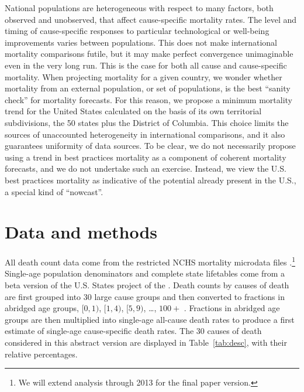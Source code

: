 \documentclass[11pt,oneside,a4paper]{article} %
\begin{document}
National populations are heterogeneous with respect to many factors, both
observed and unobserved, that affect cause-specific mortality rates. The level and timing of cause-specific responses to particular
technological or well-being improvements varies between populations. This does
not make international mortality comparisons futile, but it may make perfect
convergence unimaginable even in the very long run. This is the case for both
all cause and cause-specific mortality. When projecting mortality for a given country, we wonder whether mortality from an external population, or set of populations, is the best ``sanity
check'' for mortality forecasts.
For this reason, we propose a minimum mortality trend for the United States
calculated on the basis of its own territorial subdivisions, the 50 states plus
the District of Columbia. This choice limits the sources of unaccounted
heterogeneity in international comparisons, and it also guarantees uniformity of
data sources.
To be clear, we do not necessarily propose using a trend in best practices mortality as a component of coherent mortality forecasts, and we do
not undertake such an exercise. Instead, we view the U.S. best practices
mortality as indicative of the potential already present in the U.S., a special
kind of ``nowcast''.

\section*{Data and methods}
All death count data come from the restricted NCHS mortality microdata files
\citep{NCHSdata}.\footnote{We will extend analysis
through 2013 for the final paper version.} Single-age population denominators
and complete state lifetables come from a beta version of the U.S.
States project of the \citet{HMD}. Death counts by causes of death are first
grouped into 30 large cause groups and then converted to fractions in abridged
age groups, $[0,1)$, $[1,4)$, $[5,9)$, \ldots, $100+$ \citep{HMDMP}. Fractions
in abridged age groups are then multiplied into single-age all-cause death
rates to produce a first estimate of single-age cause-specific death rates.
The 30 causes of death considered in this abstract
version are displayed in Table~\ref{tab:desc}, with their relative percentages.
\end{document}
